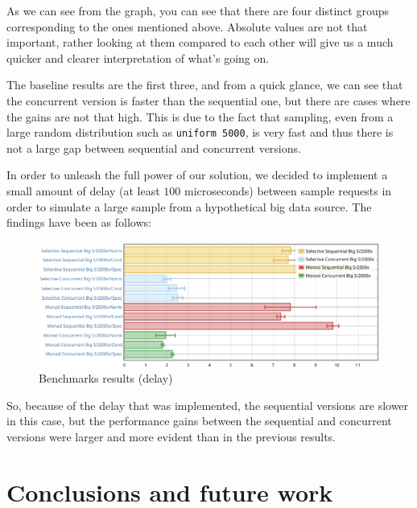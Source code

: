\documentclass[
  oneside,
  11pt, a4paper,
  footinclude=true,
  headinclude=true,
  cleardoublepage=empty
]{scrbook}
\theoremstyle{definition}
\theoremstyle{definition}
\begin{document}
    As we can see from the graph, you can see that there are four distinct groups corresponding to the ones mentioned above. Absolute values are not that important, rather looking at them compared to each other will give us a much quicker and clearer interpretation of what's going on.
    
    The baseline results are the first three, and from a quick glance, we can see that the concurrent version is faster than the sequential one, but there are cases where the gains are not that high. This is due to the fact that sampling, even from a large random distribution such as \texttt{uniform 5000}, is very fast and thus there is not a large gap between sequential and concurrent versions.
    
    In order to unleash the full power of our solution, we decided to implement a small amount of delay (at least $100$ microseconds) between sample requests in order to simulate a large sample from a hypothetical big data source. The findings have been as follows:
    
    \begin{figure}[H]
        \centering
        \includegraphics{img/delay.pdf}
        \caption{Benchmarks results (delay)}
        \label{fig:delay}
    \end{figure}
    
    So, because of the delay that was implemented, the sequential versions are slower in this case, but the performance gains between the sequential and concurrent versions were larger and more evident than in the previous results.
        
	\chapter{Conclusions and future work}\label{ch-conclusion}
	
\end{document}
